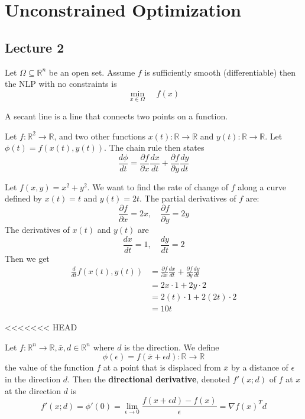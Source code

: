\section{Unconstrained Optimization}
\subsection{Lecture 2}
\begin{problem}
    Let $\Omega \subseteq \mathbb R^n$ be an open set. Assume $f$ is sufficiently smooth (differentiable) then the NLP with no constraints is $$\min_{x \in \Omega} \;\;\;\; f(x)$$
\end{problem}
\begin{definition}
    A secant line is a line that connects two points on a function.
\end{definition}
\begin{theorem}
    Let $f: \mathbb R^2 \rightarrow \mathbb R$, and two other functions $x(t): \mathbb R \rightarrow \mathbb R$ and $y(t): \mathbb R \rightarrow \mathbb R$. Let $\phi(t) = f(x(t), y(t))$. The chain rule then states
    $$\frac{d\phi}{dt} = \frac{\partial f}{\partial x} \frac{dx}{dt} + \frac{\partial f}{\partial y} \frac{dy}{dt}$$
\end{theorem}
\begin{problem}
    Let $f(x,y) = x^2 + y^2$. We want to find the rate of change of $f$ along a curve defined by $x(t) = t$ and $y(t) = 2t$. The partial derivatives of $f$ are: $$\frac{\partial f}{\partial x} = 2x, \quad \frac{\partial f}{\partial y} = 2y$$ The derivatives of $x(t)$ and $y(t)$ are $$\frac{dx}{dt} = 1, \quad \frac{dy}{dt} = 2$$ Then we get
    \begin{align*}
        \frac{d}{dt} f(x(t), y(t)) &= \frac{\partial f}{\partial x} \frac{dx}{dt} + \frac{\partial f}{\partial y} \frac{dy}{dt} \\
        &= 2x \cdot 1 + 2y \cdot 2 \\
        &= 2(t) \cdot 1 + 2(2t) \cdot 2 \\
        &= 10t
    \end{align*}
\end{problem}
<<<<<<< HEAD
\begin{lemma}
    Let $f: \mathbb R^n \rightarrow \mathbb R, \bar x, d \in \mathbb R^n$ where $d$ is the direction. We define
    $$\phi (\epsilon) = f(\bar x + \epsilon d): \mathbb R \rightarrow \mathbb R$$ the value of the function $f$ at a point that is displaced from $\bar x$ by a distance of $\epsilon$ in the direction $d$.
    Then the \textbf{directional derivative}, denoted $f'(x; d)$ of $f$ at $x$ at the direction $d$ is
    $$f'(x; d) = \phi'(0) = \lim_{\epsilon \rightarrow 0} \frac{f(x + \epsilon d) - f(x)}{\epsilon} = \nabla f(x)^T d$$
\end{lemma}
